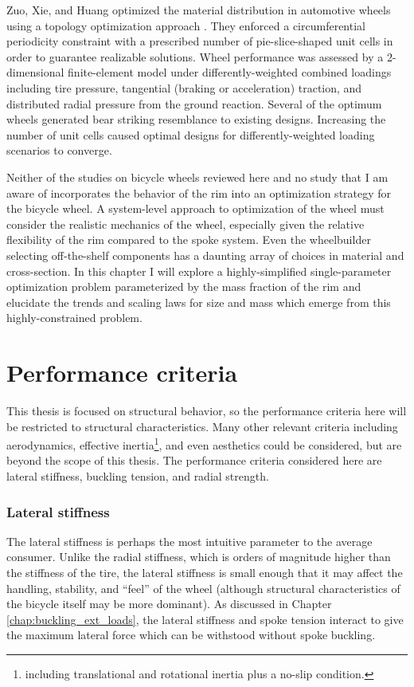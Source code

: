 \documentclass[\rootdir/thesis.tex]{subfiles}
\begin{document}
Zuo, Xie, and Huang optimized the material distribution in automotive wheels using a topology optimization approach \cite{Zuo2011}. They enforced a circumferential periodicity constraint with a prescribed number of pie-slice-shaped unit cells in order to guarantee realizable solutions. Wheel performance was assessed by a 2-dimensional finite-element model under differently-weighted combined loadings including tire pressure, tangential (braking or acceleration) traction, and distributed radial pressure from the ground reaction. Several of the optimum wheels generated bear striking resemblance to existing designs. Increasing the number of unit cells caused optimal designs for differently-weighted loading scenarios to converge.

Neither of the studies on bicycle wheels \cite{Svensson2015,Keller2013} reviewed here and no study that I am aware of incorporates the behavior of the rim into an optimization strategy for the bicycle wheel. A system-level approach to optimization of the wheel must consider the realistic mechanics of the wheel, especially given the relative flexibility of the rim compared to the spoke system. Even the wheelbuilder selecting off-the-shelf components has a daunting array of choices in material and cross-section. In this chapter I will explore a highly-simplified single-parameter optimization problem parameterized by the mass fraction of the rim and elucidate the trends and scaling laws for size and mass which emerge from this highly-constrained problem.


\section{Performance criteria}

This thesis is focused on structural behavior, so the performance criteria here will be restricted to structural characteristics. Many other relevant criteria including aerodynamics, effective inertia\footnote{including translational and rotational inertia plus a no-slip condition.}, and even aesthetics could be considered, but are beyond the scope of this thesis. The performance criteria considered here are lateral stiffness, buckling tension, and radial strength.

\subsubsection*{Lateral stiffness}
The lateral stiffness is perhaps the most intuitive parameter to the average consumer. Unlike the radial stiffness, which is orders of magnitude higher than the stiffness of the tire, the lateral stiffness is small enough that it may affect the handling, stability, and ``feel'' of the wheel (although structural characteristics of the bicycle itself may be more dominant). As discussed in Chapter \ref{chap:buckling_ext_loads}, the lateral stiffness and spoke tension interact to give the maximum lateral force which can be withstood without spoke buckling.
\end{document}
